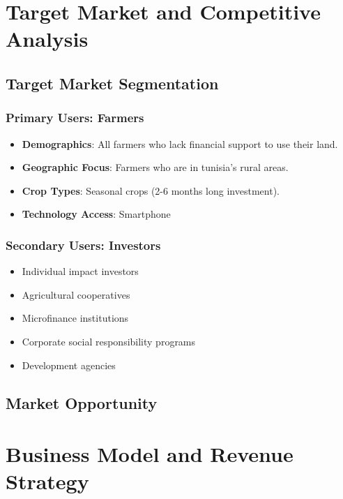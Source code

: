 \documentclass[9pt,twocolumn,twoside]{article}
\begin{document}
\section{Target Market and Competitive Analysis} \label{sec:market}

\subsection{Target Market Segmentation}

\subsubsection{Primary Users: Farmers}

\begin{itemize}
  \item \textbf{Demographics}: All farmers who lack financial support to use their land.
  \item \textbf{Geographic Focus}: Farmers who are in tunisia's rural areas.
  \item \textbf{Crop Types}: Seasonal crops (2-6 months long investment).
  \item \textbf{Technology Access}: Smartphone
\end{itemize}

\subsubsection{Secondary Users: Investors}

\begin{itemize}
  \item Individual impact investors
  \item Agricultural cooperatives
  \item Microfinance institutions
  \item Corporate social responsibility programs
  \item Development agencies
\end{itemize}

\subsection{Market Opportunity}

\section{Business Model and Revenue Strategy} \label{sec:business}
\end{document}
